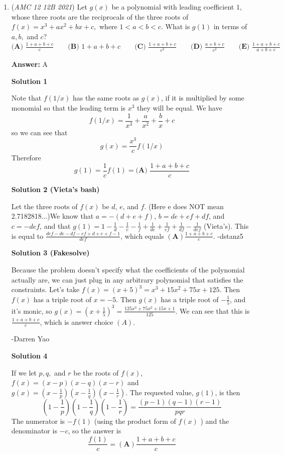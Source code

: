 \begin{enumerate}
 


	\item (\textit{AMC 12 12B 2021}) Let $g(x)$ be a polynomial with leading coefficient $1,$ whose three roots are the reciprocals of the three roots of $f(x)=x^3+ax^2+bx+c,$ where $1<a<b<c.$ What is $g(1)$ in terms of $a,b,$ and $c?$
$\textbf{(A) }\frac{1+a+b+c}c \qquad \textbf{(B) }1+a+b+c \qquad \textbf{(C) }\frac{1+a+b+c}{c^2}\qquad \textbf{(D) }\frac{a+b+c}{c^2} \qquad \textbf{(E) }\frac{1+a+b+c}{a+b+c}$

 \textbf{Answer: }A



\textbf{Solution 1}

Note that $f(1/x)$ has the same roots as $g(x)$, if it is multiplied by some monomial so that the leading term is $x^3$ they will be equal. We have
 \[f(1/x) = \frac{1}{x^3} + \frac{a}{x^2}+\frac{b}{x} + c\]so we can see that
 \[g(x) = \frac{x^3}{c}f(1/x)\]Therefore
 \[g(1) = \frac{1}{c}f(1) = \boxed{\textbf{(A) }\frac{1+a+b+c}c}\]




\textbf{Solution 2 (Vieta's bash)}

Let the three roots of $f(x)$ be $d$, $e$, and $f$. (Here e does NOT mean 2.7182818...)We know that $a=-(d+e+f)$, $b=de+ef+df$, and $c=-def$, and that $g(1)=1-\frac{1}{d}-\frac{1}{e}-\frac{1}{f}+\frac{1}{de}+\frac{1}{ef}+\frac{1}{df}-\frac{1}{def}$ (Vieta's). This is equal to $\frac{def-de-df-ef+d+e+f-1}{def}$, which equals $\boxed{(\textbf{A}) \frac{1+a+b+c}{c}}$. -dstanz5

 



\textbf{Solution 3 (Fakesolve)}

Because the problem doesn't specify what the coefficients of the polynomial actually are, we can just plug in any arbitrary polynomial that satisfies the constraints. Let's take $f(x) = (x+5)^3 = x^3+15x^2+75x+125$. Then $f(x)$ has a triple root of $x = -5$. Then $g(x)$ has a triple root of $-\frac{1}{5}$, and it's monic, so $g(x) = \left(x+\frac{1}{5}\right)^3 = \frac{125x^3+75x^2+15x+1}{125}$. We can see that this is $\frac{1+a+b+c}{c}$, which is answer choice $\boxed{(A)}$.

 -Darren Yao

 



\textbf{Solution 4}

If we let $p, q,$ and $r$ be the roots of $f(x)$, $f(x) = (x-p)(x-q)(x-r)$ and $g(x) = \left(x-\frac{1}{p}\right)\left(x-\frac{1}{q}\right)\left(x-\frac{1}{r}\right)$. The requested value, $g(1)$, is then
 \[\left(1-\frac{1}{p}\right)\left(1-\frac{1}{q}\right)\left(1-\frac{1}{r}\right) = \frac{(p-1)(q-1)(r-1)}{pqr}\]The numerator is $-f(1)$ (using the product form of $f(x)$ ) and the denominator is $-c$, so the answer is
 \[\frac{f(1)}{c} = \boxed{(\textbf{A}) \frac{1+a+b+c}{c}}\]


\end{enumerate}
